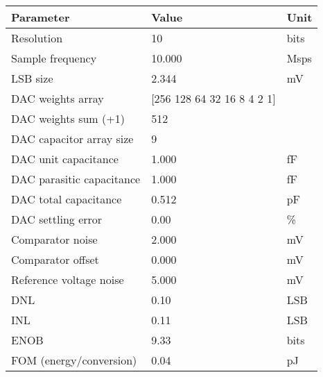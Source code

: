 \begin{tabular}{lll}
\toprule
Parameter & Value & Unit \\
\midrule
Resolution & 10 & bits \\
Sample frequency & 10.000 & Msps \\
LSB size & 2.344 & mV \\
DAC weights array & [256 128  64  32  16   8   4   2   1] &  \\
DAC weights sum (+1) & 512 &  \\
DAC capacitor array size & 9 &  \\
DAC unit capacitance & 1.000 & fF \\
DAC parasitic capacitance & 1.000 & fF \\
DAC total capacitance & 0.512 & pF \\
DAC settling error & 0.00 & \% \\
Comparator noise & 2.000 & mV \\
Comparator offset & 0.000 & mV \\
Reference voltage noise & 5.000 & mV \\
DNL & 0.10 & LSB \\
INL & 0.11 & LSB \\
ENOB & 9.33 & bits \\
FOM (energy/conversion) & 0.04 & pJ \\
\bottomrule
\end{tabular}
